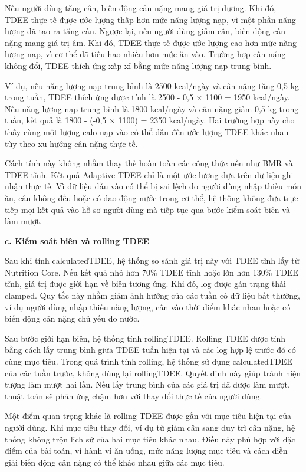 \documentclass[12pt, a4paper]{report}
\begin{document}
Nếu người dùng tăng cân, biến động cân nặng mang giá trị dương. Khi đó, TDEE thực tế được ước lượng thấp hơn mức năng lượng nạp, vì một phần năng lượng đã tạo ra tăng cân. Ngược lại, nếu người dùng giảm cân, biến động cân nặng mang giá trị âm. Khi đó, TDEE thực tế được ước lượng cao hơn mức năng lượng nạp, vì cơ thể đã tiêu hao nhiều hơn mức ăn vào. Trường hợp cân nặng không đổi, TDEE thích ứng xấp xỉ bằng mức năng lượng nạp trung bình.

Ví dụ, nếu năng lượng nạp trung bình là 2500 kcal/ngày và cân nặng tăng 0,5 kg trong tuần, TDEE thích ứng được tính là 2500 - 0,5 × 1100 = 1950 kcal/ngày. Nếu năng lượng nạp trung bình là 1800 kcal/ngày và cân nặng giảm 0,5 kg trong tuần, kết quả là 1800 - (-0,5 × 1100) = 2350 kcal/ngày. Hai trường hợp này cho thấy cùng một lượng calo nạp vào có thể dẫn đến ước lượng TDEE khác nhau tùy theo xu hướng cân nặng thực tế.

Cách tính này không nhằm thay thế hoàn toàn các công thức nền như BMR và TDEE tĩnh. Kết quả Adaptive TDEE chỉ là một ước lượng dựa trên dữ liệu ghi nhận thực tế. Vì dữ liệu đầu vào có thể bị sai lệch do người dùng nhập thiếu món ăn, cân không đều hoặc có dao động nước trong cơ thể, hệ thống không đưa trực tiếp mọi kết quả vào hồ sơ người dùng mà tiếp tục qua bước kiểm soát biên và làm mượt.

\textbf{c. Kiểm soát biên và rolling TDEE}

Sau khi tính calculatedTDEE, hệ thống so sánh giá trị này với TDEE tĩnh lấy từ Nutrition Core. Nếu kết quả nhỏ hơn 70\% TDEE tĩnh hoặc lớn hơn 130\% TDEE tĩnh, giá trị được giới hạn về biên tương ứng. Khi đó, log được gán trạng thái clamped. Quy tắc này nhằm giảm ảnh hưởng của các tuần có dữ liệu bất thường, ví dụ người dùng nhập thiếu năng lượng, cân vào thời điểm khác nhau hoặc có biến động cân nặng chủ yếu do nước.

Sau bước giới hạn biên, hệ thống tính rollingTDEE. Rolling TDEE được tính bằng cách lấy trung bình giữa TDEE tuần hiện tại và các log hợp lệ trước đó có cùng mục tiêu. Trong quá trình tính rolling, hệ thống sử dụng calculatedTDEE của các tuần trước, không dùng lại rollingTDEE. Quyết định này giúp tránh hiện tượng làm mượt hai lần. Nếu lấy trung bình của các giá trị đã được làm mượt, thuật toán sẽ phản ứng chậm hơn với thay đổi thực tế của người dùng.

Một điểm quan trọng khác là rolling TDEE được gắn với mục tiêu hiện tại của người dùng. Khi mục tiêu thay đổi, ví dụ từ giảm cân sang duy trì cân nặng, hệ thống không trộn lịch sử của hai mục tiêu khác nhau. Điều này phù hợp với đặc điểm của bài toán, vì hành vi ăn uống, mức năng lượng mục tiêu và cách diễn giải biến động cân nặng có thể khác nhau giữa các mục tiêu.
\end{document}
